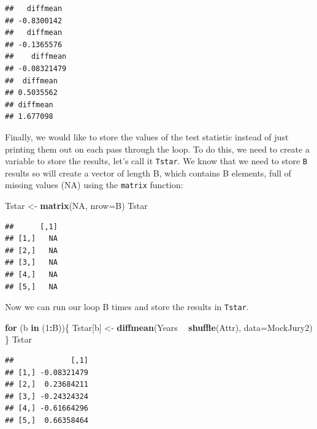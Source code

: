 \documentclass[]{book}
\newenvironment{Shaded}{\begin{snugshade}}{\end{snugshade}}
\newcommand{\KeywordTok}[1]{\textcolor[rgb]{0.13,0.29,0.53}{\textbf{#1}}}
\newcommand{\DataTypeTok}[1]{\textcolor[rgb]{0.13,0.29,0.53}{#1}}
\newcommand{\DecValTok}[1]{\textcolor[rgb]{0.00,0.00,0.81}{#1}}
\newcommand{\StringTok}[1]{\textcolor[rgb]{0.31,0.60,0.02}{#1}}
\newcommand{\OtherTok}[1]{\textcolor[rgb]{0.56,0.35,0.01}{#1}}
\newcommand{\ControlFlowTok}[1]{\textcolor[rgb]{0.13,0.29,0.53}{\textbf{#1}}}
\newcommand{\OperatorTok}[1]{\textcolor[rgb]{0.81,0.36,0.00}{\textbf{#1}}}
\newcommand{\NormalTok}[1]{#1}
\theoremstyle{definition}
\theoremstyle{definition}
\theoremstyle{remark}
\begin{document}
\begin{verbatim}
##   diffmean 
## -0.8300142 
##   diffmean 
## -0.1365576 
##    diffmean 
## -0.08321479 
##  diffmean 
## 0.5035562 
## diffmean 
## 1.677098
\end{verbatim}

Finally, we would like to store the values of the test statistic instead
of just printing them out on each pass through the loop. To do this, we
need to create a variable to store the results, let's call it
\texttt{Tstar}. We know that we need to store \texttt{B} results so will
create a vector of length B, which contains B elements, full of missing
values (NA) using the \texttt{matrix} function:

\begin{Shaded}
\begin{Highlighting}[]
\NormalTok{Tstar <-}\StringTok{ }\KeywordTok{matrix}\NormalTok{(}\OtherTok{NA}\NormalTok{, }\DataTypeTok{nrow=}\NormalTok{B)}
\NormalTok{Tstar}
\end{Highlighting}
\end{Shaded}

\begin{verbatim}
##      [,1]
## [1,]   NA
## [2,]   NA
## [3,]   NA
## [4,]   NA
## [5,]   NA
\end{verbatim}

Now we can run our loop B times and store the results in \texttt{Tstar}.

\begin{Shaded}
\begin{Highlighting}[]
\ControlFlowTok{for}\NormalTok{ (b }\ControlFlowTok{in}\NormalTok{ (}\DecValTok{1}\OperatorTok{:}\NormalTok{B))\{}
\NormalTok{  Tstar[b] <-}\StringTok{ }\KeywordTok{diffmean}\NormalTok{(Years }\OperatorTok{~}\StringTok{ }\KeywordTok{shuffle}\NormalTok{(Attr), }\DataTypeTok{data=}\NormalTok{MockJury2)}
\NormalTok{\}}
\NormalTok{Tstar}
\end{Highlighting}
\end{Shaded}

\begin{verbatim}
##             [,1]
## [1,] -0.08321479
## [2,]  0.23684211
## [3,] -0.24324324
## [4,] -0.61664296
## [5,]  0.66358464
\end{verbatim}
\end{document}
